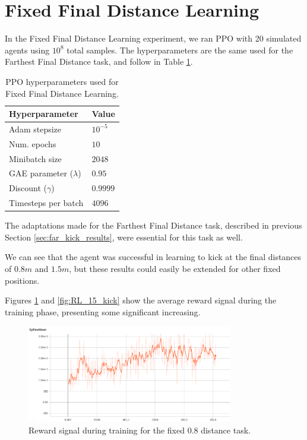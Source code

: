 \section{Fixed Final Distance Learning}

In the Fixed Final Distance Learning experiment, we ran PPO with 20 simulated agents using $10^8$ total samples. The hyperparameters are the same used for the Farthest Final Distance task, and follow in Table \ref{tab:fix_kick}.

\begin{table}[ht]
    \begin{tabular}{|l|l|}
    \hline
    Hyperparameter            & Value    \\  \hline
    Adam stepsize             & $10^{-5}$ \\
    Num. epochs               & $10$     \\
    Minibatch size            & $2048$     \\
    GAE parameter ($\lambda$) & $0.95$   \\
    Discount ($\gamma$)       & $0.9999$ \\
    Timesteps per batch       & $4096$   \\ \hline
    \end{tabular}
\centering
\caption{PPO hyperparameters used for Fixed Final Distance Learning.}
\label{tab:fix_kick}
\end{table}

The adaptations made for the Farthest Final Distance task, described in previous Section \ref{sec:far_kick_results}, were essential for this task as well.

We can see that the agent was successful in learning to kick at the final distances of $0.8m$ and $1.5m$, but these results could easily be extended for other fixed positions.

Figures \ref{fig:RL_08_kick} and \ref{fig:RL_15_kick} show the average reward signal during the training phase, presenting some significant increasing.

\begin{figure}[H]
    \centering
    \includegraphics[width=0.8\textwidth]{Chapter7/figures/rew_mean_fix_08.png} 
    \caption{Reward signal during training for the fixed 0.8 distance task.}
    \label{fig:RL_08_kick}
\end{figure}

